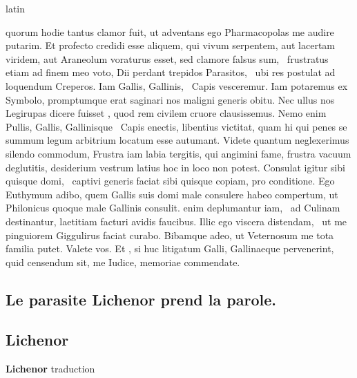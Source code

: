 \documentclass[12pt]{book}
\renewenvironment{latin}
    	{\begin{hyphenrules}{latin}}
    	{\end{hyphenrules}}
\begin{document}
\begin{pages}
\begin{latin}
\begin{Leftside}
                        quorum hodie tantus clamor fuit, 
                        ut adventans ego Pharmacopolas me audire putarim. 
                        Et profecto credidi esse aliquem, qui vivum serpentem, aut lacertam viridem, aut Araneolum voraturus esset, sed clamore falsus sum, ﻿\ampersand\ frustratus etiam ad finem meo voto, Dii perdant trepidos Parasitos, ﻿\ampersand\ ubi res postulat ad loquendum Creperos. 
                        Iam Gallis, Gallinis, ﻿\ampersand\ Capis vesceremur. 
                        Iam potaremus ex Symbolo, promptumque erat saginari nos maligni generis obitu. 
                        Nec ullus nos Legirupas dicere fuisset , 
                        quod rem civilem cruore clausissemus. 
                        Nemo enim Pullis, Gallis, Gallinisque ﻿\ampersand\ Capis enectis, libentius victitat, 
                        quam hi qui penes se summum legum arbitrium locatum esse autumant. 
                        Videte quantum neglexerimus silendo commodum, 
                        Frustra iam labia tergitis, qui angimini fame, frustra vacuum deglutitis, desiderium vestrum latius hoc in loco  non potest. 
                        Consulat igitur sibi quisque domi, ﻿\ampersand\ captivi generis faciat sibi quisque copiam, pro conditione. 
                        Ego Euthymum adibo, 
                        quem Gallis suis domi male consulere habeo compertum, 
                        ut Philonicus quoque male Gallinis consulit. 
                         enim deplumantur iam, ﻿\ampersand\ ad Culinam destinantur, laetitiam facturi avidis faucibus. 
                        Illic ego viscera distendam, ﻿\ampersand\ ut me pinguiorem Giggulirus faciat curabo. 
                        Bibamque adeo, 
                        ut Veternosum me tota familia putet. 
                        Valete vos. 
                        Et , si huc litigatum Galli, Gallinaeque pervenerint, 
                        quid censendum sit, me Iudice, memoriae commendate.
                    \pend 
        \endnumbering
        \end{Leftside}
        \end{latin}

        \begin{Rightside}
        \beginnumbering
            \pstart\section*{Le parasite Lichenor prend la parole.}\pend\pstart\subsection*{Lichenor}\pend\pstart\textbf{Lichenor}\hspace{1cm} 
                        traduction
                    \pend
        \endnumbering
        \end{Rightside}
        \end{pages}
        \Pages
        
\end{document}
